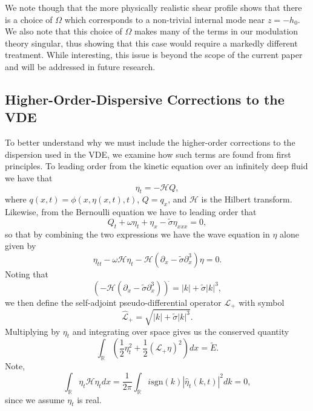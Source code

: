 \documentclass[a4paper,11pt]{article}
\newcommand{\pd}{\partial}
\begin{document}
We note though that the more physically realistic shear profile shows that there is a choice of $\Omega$ which corresponds to a non-trivial internal mode near $z=-h_{0}$.  We also note that this choice of $\Omega$ makes many of the terms in our modulation theory singular, thus showing that this case would require a markedly different treatment.  While interesting, this issue is beyond the scope of the current paper and will be addressed in future research. 

\subsection*{Higher-Order-Dispersive Corrections to the VDE}

To better understand why we must include the higher-order corrections to the dispersion used in the VDE, we examine how such terms are found from first principles.  To leading order from the kinetic equation over an infinitely deep fluid we have that 
\[
\eta_{t} = -\mathcal{H}Q,
\]
where $q(x,t) = \phi(x,\eta(x,t),t)$, $Q = q_{x}$, and $\mathcal{H}$ is the Hilbert transform.  Likewise, from the Bernoulli equation we have to leading order that
\[
Q _{t}+ \omega\eta_{t} + \eta_{x} -\tilde{\sigma}\eta_{xxx}= 0, 
\]
so that by combining the two expressions we have the wave equation in $\eta$ alone given by 
\begin{equation}
\eta_{tt}- \omega\mathcal{H}\eta_{t} - \mathcal{H} \left(\pd_{x} -\tilde{\sigma}\pd^{3}_{x}\right)\eta= 0.
\label{linearwaveeq}
\end{equation}
Noting that 
\[
\left(-\mathcal{H}\left(\pd_{x} - \tilde{\sigma}\pd^{3}_{x}\right)\right)^{\widehat{}} = \left|k\right| + \tilde{\sigma}\left|k\right|^{3},
\]
we then define the self-adjoint pseudo-differential operator $\mathcal{L}_{+}$ with symbol 
\[
\mathcal{\widehat{L}}_{+} = \sqrt{\left|k\right| + \tilde{\sigma}\left|k\right|^{3}}.
\]
Multiplying by $\eta_{t}$ and integrating over space gives us the conserved quantity
\[
\int_{\mathbb{R}} \left(\frac{1}{2}\eta_{t}^{2} + \frac{1}{2}\left(\mathcal{L}_{+}\eta \right)^{2}\right) dx = \tilde{E}.
\]
Note, 
\[
\int_{\mathbb{R}}\eta_{t}\mathcal{H}\eta_{t} dx = \frac{1}{2\pi}\int_{\mathbb{R}} i\mbox{sgn}(k) \left|\hat{\eta}_{t}(k,t) \right|^{2} dk = 0,
\]
since we assume $\eta_{t}$ is real.  
\end{document}
